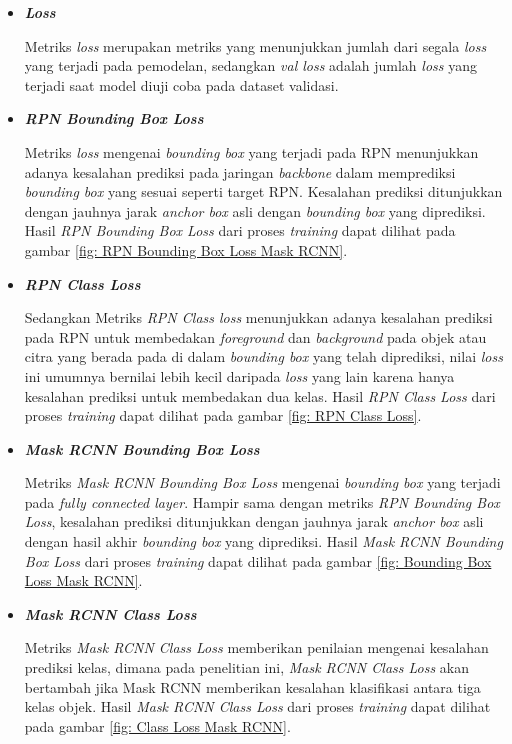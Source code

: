 \begin{itemize}
  \item \textbf{\textit{Loss}} 
  
  Metriks \textit{loss} merupakan metriks yang menunjukkan jumlah dari segala \textit{loss} yang terjadi pada
  pemodelan, sedangkan \textit{val loss} adalah jumlah \textit{loss} yang terjadi saat model
  diuji coba pada dataset validasi.

  \item \textbf{\textit{RPN Bounding Box Loss}} 
  
  Metriks \textit{loss} mengenai \textit{bounding box} yang terjadi pada RPN menunjukkan adanya
  kesalahan prediksi pada jaringan \textit{backbone} dalam memprediksi \textit{bounding box} yang
  sesuai seperti target RPN. Kesalahan prediksi ditunjukkan dengan jauhnya jarak \textit{anchor box} asli
  dengan \textit{bounding box} yang diprediksi. Hasil \textit{RPN Bounding Box Loss} dari proses \textit{training} dapat dilihat pada gambar
  \ref{fig: RPN Bounding Box Loss Mask RCNN}.

  \item \textbf{\textit{RPN Class Loss}} 
  
  Sedangkan Metriks \textit{RPN Class loss} menunjukkan adanya kesalahan prediksi pada RPN
  untuk membedakan \textit{foreground} dan \textit{background} pada objek atau citra yang berada
  pada di dalam \textit{bounding box} yang telah diprediksi, nilai \textit{loss} ini umumnya bernilai
  lebih kecil daripada \textit{loss} yang lain karena hanya kesalahan prediksi untuk membedakan 
  dua kelas. Hasil \textit{RPN Class Loss} dari proses \textit{training} dapat dilihat pada gambar
  \ref{fig: RPN Class Loss}.

  \item \textbf{\textit{Mask RCNN Bounding Box Loss}} 
  
  Metriks \textit{Mask RCNN Bounding Box Loss} mengenai \textit{bounding box} yang terjadi pada 
  \textit{fully connected layer}. Hampir sama dengan metriks \textit{RPN Bounding Box Loss}, 
  kesalahan prediksi ditunjukkan dengan jauhnya jarak \textit{anchor box} asli
  dengan hasil akhir \textit{bounding box} yang diprediksi. Hasil \textit{Mask RCNN Bounding Box Loss} 
  dari proses \textit{training} dapat dilihat pada gambar \ref{fig: Bounding Box Loss Mask RCNN}.

  \item \textbf{\textit{Mask RCNN Class Loss}} 
  
  Metriks \textit{Mask RCNN Class Loss} memberikan penilaian mengenai kesalahan prediksi kelas,
  dimana pada penelitian ini, \textit{Mask RCNN Class Loss} akan bertambah jika Mask RCNN 
  memberikan kesalahan klasifikasi antara tiga kelas objek. Hasil \textit{Mask RCNN Class Loss} 
  dari proses \textit{training} dapat dilihat pada gambar \ref{fig: Class Loss Mask RCNN}.


\end{itemize}
